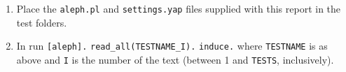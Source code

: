 \documentclass[12pt, openany]{book}
\begin{document}
\begin{appendices}
\begin{enumerate}
	\item Place the \texttt{aleph.pl} and \texttt{settings.yap} files supplied with this report in the test folders.

	\item In \yap run \hfill \hfill \linebreak
		\texttt{[aleph].}\linebreak
		\texttt{read\_all(TESTNAME\_I).}\linebreak
		\texttt{induce.}\linebreak
		where \texttt{TESTNAME} is as above and \texttt{I} is the number of the text (between 1 and \texttt{TESTS}, inclusively).
\end{enumerate}



\end{appendices}
\end{document}
